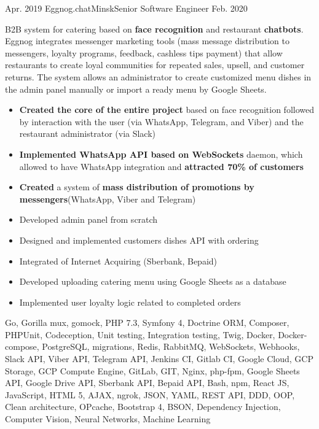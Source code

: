 \begin{experiences}
  \experience
  {Apr. 2019} {Eggnog.chat}{Minsk}{Senior Software Engineer}
  {Feb. 2020}
  {
    B2B system for catering based on \textbf{face recognition} and restaurant \textbf{chatbots}. Eggnog integrates messenger marketing
    tools (mass message distribution to messengers, loyalty programs, feedback, cashless tips payment) that allow
    restaurants to create loyal communities for repeated sales, upsell, and customer returns. The system allows an administrator to create
    customized menu dishes in the admin panel manually or import a ready menu by Google Sheets.
    \begin{itemize}
      \item {\textbf{Created the core of the entire project} based on face recognition followed by interaction with
      the user (via WhatsApp, Telegram, and Viber) and the restaurant administrator (via Slack)}
      \item {\textbf{Implemented WhatsApp API based on WebSockets} daemon, which allowed to have WhatsApp integration and \textbf{attracted 70\% of customers}}
      \item {\textbf{Created} a system of \textbf{mass distribution of promotions by messengers}(WhatsApp, Viber and Telegram)}
      \item {Developed admin panel from scratch}
      \item {Designed and implemented customers dishes API with ordering}
      \item {Integrated of Internet Acquiring  (Sberbank, Bepaid)}
      \item {Developed uploading catering menu using Google Sheets as a database}
      \item {Implemented user loyalty logic related to completed orders}
    \end{itemize}
  }
  {
    Go, Gorilla mux, gomock, PHP 7.3, Symfony 4, Doctrine ORM, Composer, PHPUnit, Codeception, Unit testing, Integration testing,
    Twig, Docker, Docker-compose, PostgreSQL, migrations, Redis, RabbitMQ, WebSockets, Webhooks, Slack API, Viber API, Telegram API,
    Jenkins CI, Gitlab CI, Google Cloud, GCP Storage, GCP Compute Engine, GitLab, GIT, Nginx, php-fpm, Google Sheets API, Google Drive
  API, Sberbank API, Bepaid API, Bash, npm, React JS, JavaScript, HTML 5, AJAX, ngrok, JSON, YAML, REST API, DDD, OOP, Clean architecture,
    OPcache, Bootstrap 4, BSON, Dependency Injection, Computer Vision, Neural Networks, Machine Learning
  }
  \emptySeparator


\end{experiences}
